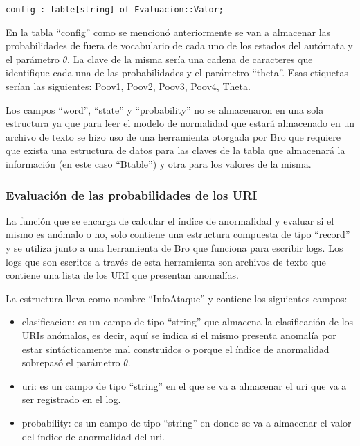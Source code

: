\begin{verbatim}
config : table[string] of Evaluacion::Valor;
\end{verbatim}

En la tabla “config” como se mencionó anteriormente se van a almacenar las probabilidades de fuera de vocabulario de cada uno de los estados del autómata y el parámetro $\theta$. La clave de la misma sería una cadena de caracteres que identifique cada una de las probabilidades  y el parámetro “theta”. Esas etiquetas serían las siguientes: Poov1, Poov2, Poov3, Poov4, Theta.  

Los campos “word”, “state” y “probability” no se almacenaron en una sola estructura ya que para leer el modelo de normalidad que estará almacenado en un archivo de texto se hizo uso de una herramienta otorgada por Bro que requiere que exista una estructura de datos  para las claves de la tabla que almacenará la información (en este caso “Btable”) y otra para los valores de la misma.

\subsubsection{Evaluación de las probabilidades de los URI}
\label{sssec:estructuraEvaluacion}

La función  que se encarga de calcular el índice de anormalidad  y evaluar si el mismo es anómalo o no, solo contiene una estructura compuesta de tipo “record” y se utiliza junto a una herramienta de Bro que funciona para escribir logs. Los logs que son escritos a través de esta herramienta son archivos de texto que contiene una lista de los URI que presentan anomalías.

La estructura lleva como nombre “InfoAtaque” y contiene los siguientes campos:

\begin{itemize}
\item clasificacion: es un campo de tipo “string” que almacena la clasificación de los URIs anómalos, es decir, aquí se indica si el mismo presenta anomalía por estar sintácticamente mal construidos o porque el índice de anormalidad sobrepasó el parámetro $\theta$.
\item uri: es un campo de tipo “string” en el que se va a almacenar el uri que va a ser registrado en el log.
\item probability: es un campo de tipo “string” en donde se va a almacenar el valor del índice de anormalidad del uri.
\end{itemize}

